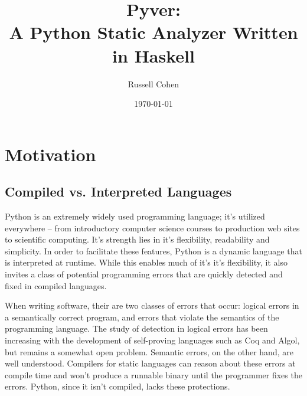 \documentclass{article}[12pt]
\author{Russell Cohen}
\title{Pyver: \\ A Python Static Analyzer Written in Haskell}
\date{\today}
\begin{document}
\renewcommand{\theFancyVerbLine}{
      \sffamily\textcolor[rgb]{0.5,0.5,0.5}{\scriptsize\arabic{FancyVerbLine}}}

\maketitle
\section{Motivation}

\subsection{Compiled vs. Interpreted Languages}
\doublespacing

Python is an extremely widely used programming language; it's utilized everywhere -- from introductory computer science
courses to production web sites to scientific computing. It's strength lies in it's flexibility, readability and
simplicity. In order to facilitate these features, Python is a dynamic language that is interpreted at runtime. While
this enables much of it's it's flexibility, it also invites a class of potential programming errors that are quickly
detected and fixed in compiled languages.

When writing software, their are two classes of errors that occur: logical errors in a semantically correct program, and
errors that violate the semantics of the programming language. The study of detection in logical errors has been
increasing with the development of self-proving languages such as Coq and Algol, but remains a somewhat open problem.
Semantic errors, on the other hand, are well understood. Compilers for static languages can reason about these
errors at compile time and won't produce a runnable binary until the programmer fixes the errors. Python, since it isn't
compiled, lacks these protections.
\end{document}
